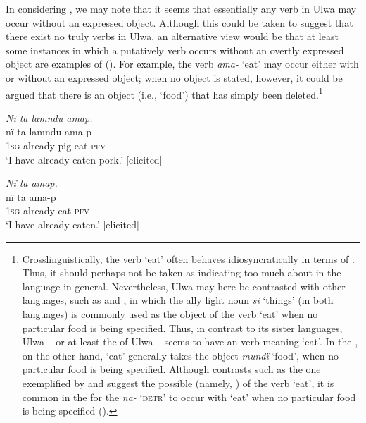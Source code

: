  In considering , we may note that it seems that essentially any verb in Ulwa may occur without an expressed object. Although this could be taken to suggest that there exist no truly  verbs in Ulwa, an alternative view would be that at least some instances in which a putatively  verb occurs without an overtly expressed object are examples of   (\citealt[124--125]{Næss2007}). For example, the verb \textit{ama-} ‘eat’ may occur either with  or without  an expressed object; when no object is stated, however, it could be argued that there is an  object (i.e., ‘food’) that has simply been deleted.\footnote{Crosslinguistically, the verb ‘eat’ often behaves idiosyncratically in terms of  \citep{Næss2009}. Thus, it should perhaps not be taken as indicating too much about  in the language in general. Nevertheless, Ulwa may here be contrasted with other  languages, such as  and , in which the ally light noun \textit{si} ‘things’ (in both languages) is commonly used as the object of the verb ‘eat’ when no particular food is being specified. Thus, in contrast to its sister languages, Ulwa -- or at least the   of Ulwa -- seems to have an  verb meaning ‘eat’. In the  , on the other hand, ‘eat’ generally takes the object \textit{mundï} ‘food’, when no particular food is being specified. Although contrasts such as the one exemplified by  and  suggest the possible  (namely, ) of the verb ‘eat’, it is common in the   for the   \textit{na-} \textsc{‘detr’} to occur with ‘eat’ when no particular food is being specified ().}

\newpage

\ea%
    \label{ex:syntax:294}
          \textit{Nï ta lamndu amap.}\\
\gll    nï    ta      lamndu  ama-p\\
    1\textsc{sg}  already    pig      eat-\textsc{pfv}\\
\glt `I have already eaten pork.’ [elicited]
\z


\ea%
    \label{ex:syntax:295}
          \textit{Nï ta amap.}\\
\gll    nï    ta      ama-p\\
    1\textsc{sg}  already    eat-\textsc{pfv}\\
\glt `I have already eaten.’ [elicited]
\z

